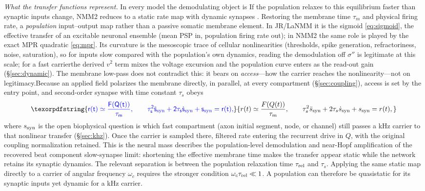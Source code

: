 \documentclass[11pt,a4paper]{article}
\newcommand{\Sig}{\sigma}
\providecommand{\DIFaddtex}[1]{{\protect\color{blue} \sf #1}} %
\providecommand{\DIFdeltex}[1]{{\protect\color{red} \scriptsize #1}} %
\providecommand{\DIFaddbegin}{} %
\providecommand{\DIFaddend}{} %
\providecommand{\DIFdelbegin}{} %
\providecommand{\DIFdelend}{} %
\providecommand{\DIFadd}[1]{\texorpdfstring{\DIFaddtex{#1}}{#1}} %
\providecommand{\DIFdel}[1]{\texorpdfstring{\DIFdeltex{#1}}{}} %
\begin{document}
\DIFdelbegin \DIFdel{\emph{What the transfer functions represent.} In every model the demodulating object is }\DIFdelend \DIFaddbegin \DIFadd{If the population relaxes to this equilibrium faster than synaptic inputs change,
NMM2 reduces to a static rate map with dynamic synapses
\cite{ruffini2021nmm2,clusella2023}. Restoring the membrane time $\tau_m$ and physical
firing rate, }\DIFaddend a \DIFdelbegin \DIFdel{\emph{population} input--output map rather than a passive somatic membrane element. In JR/LaNMM it
is the sigmoid \eqref{eq:sigmoid}, the
effective transfer of an excitable neuronal ensemble
(mean PSP in, population firing rate out); in NMM2 the same role is played by the exact MPR
quadratic \eqref{eq:mpr}. Its curvature is the mesoscopic trace of cellular nonlinearities
(thresholds, spike generation, refractoriness, noise, saturation), so for inputs slow compared with the population's own dynamics, reading the demodulation
off $\Sig''$ is legitimate at this scale; for a fast carrierthe derived $v^2$ term mixes
the voltage excursion and the population curve enters as the read-out gain
(\S\ref{sec:dynamic}).
The membrane low-pass does not contradict this: it bears on \emph{access}---how the carrier
reaches the nonlinearity---not on legitimacy.Because an applied field polarizes the membrane
directly, in parallel, at every compartment (\S\ref{sec:coupling}), access is set by the entry point, and }\DIFdelend \DIFaddbegin \DIFadd{second-order synapse with time constant $\tau_s$ obeys
}\begin{equation}
\DIFadd{r(t)\simeq \frac{F(Q(t))}{\tau_m},\qquad
\tau_s^2\ddot s_{\rm syn}+2\tau_s\dot s_{\rm syn}+s_{\rm syn}=r(t),
\label{eq:slow_synapse}
}\end{equation}
\DIFadd{where $s_{\rm syn}$ is }\DIFaddend the \DIFdelbegin \DIFdel{open biophysical question is which fast compartment (axon initial
segment, node, or channel) still passes a kHz carrier to that nonlinear transfer
(\S\ref{sec:khz}).
Once the carrier is sampled there,
}\DIFdelend \DIFaddbegin \DIFadd{filtered rate entering the recurrent drive in $Q$, with the original
coupling normalization retained. This is }\DIFaddend the \DIFdelbegin \DIFdel{neural mass describes the
population-level demodulation and near-Hopf amplification of the recovered beat component}\DIFdelend \DIFaddbegin \DIFadd{slow-synapse limit: shortening the
effective membrane time makes the transfer appear static while the network retains
its synaptic dynamics. The relevant separation is between the population relaxation
time $\tau_{\rm rel}$ and $\tau_s$. Applying the same static map directly to a
carrier of angular frequency $\omega_c$ requires the stronger condition
$\omega_c\tau_{\rm rel}\ll1$. A population can therefore be quasistatic for its
synaptic inputs yet dynamic for a kHz carrier}\DIFaddend .
\end{document}
